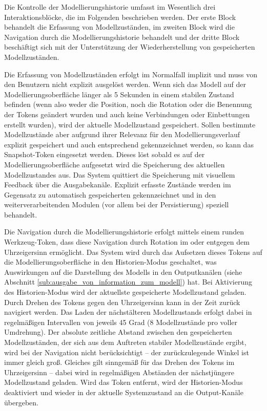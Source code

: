 Die Kontrolle der Modellierungshistorie umfasst im Wesentlich drei Interaktionsblöcke, die im Folgenden beschrieben werden. Der erste Block behandelt die Erfassung von Modellzuständen, im zweiten Block wird die Navigation durch die Modellierungshistorie behandelt und der dritte Block beschäftigt sich mit der Unterstützung der Wiederherstellung von gespeicherten Modellzuständen.

Die Erfassung von Modellzuständen erfolgt im Normalfall implizit und muss von den Benutzern nicht explizit ausgelöst werden. Wenn sich das Modell auf der Modellierungsoberfläche länger als 5 Sekunden in einem stabilen Zustand befinden (wenn also weder die Position, noch die Rotation oder die Benennung der Tokens geändert wurden und auch keine Verbindungen oder Einbettungen erstellt wurden), wird der aktuelle Modellzustand gespeichert. Sollen bestimmte Modellzustände aber aufgrund ihrer Relevanz für den Modellierungsverlauf explizit gespeichert und auch entsprechend gekennzeichnet werden, so kann das Snapshot-Token eingesetzt werden. Dieses löst sobald es auf der Modellierungsoberfläche aufgesetzt wird die Speicherung des aktuellen Modellzustandes aus. Das System quittiert die Speicherung mit visuellem Feedback über die Ausgabekanäle. Explizit erfasste Zustände werden im Gegensatz zu automatisch gespeicherten gekennzeichnet und in den weiterverarbeitenden Modulen (vor allem bei der Persistierung) speziell behandelt.

Die Navigation durch die Modellierungshistorie erfolgt mittels einem runden Werkzeug-Token, dass diese Navigation durch Rotation im oder entgegen dem Uhrzeigersinn ermöglicht. Das System wird durch das Aufsetzen dieses Tokens auf die Modellierungsoberfläche in den Historien-Modus geschaltet, was Auswirkungen auf die Darstellung des Modells in den Outputkanälen (siehe Abschnitt \ref{sub:ausgabe_von_information_zum_modell}) hat. Bei Aktivierung des Historien-Modus wird der aktuellste gespeicherte Modellzustand geladen. Durch Drehen des Tokens gegen den Uhrzeigersinn kann in der Zeit zurück navigiert werden. Das Laden der nächstälteren Modellzustands erfolgt dabei in regelmäßigen Intervallen von jeweils 45 Grad (8 Modellzustände pro voller Umdrehung). Der absolute zeitliche Abstand zwischen den gespeicherten Modellzuständen, der sich aus dem Auftreten stabiler Modellzustände ergibt, wird bei der Navigation nicht berücksichtigt -- der zurückzulegende Winkel ist immer gleich groß. Gleiches gilt sinngemäß für das Drehen des Tokens im Uhrzeigersinn -- dabei wird in regelmäßigen Abständen der nächstjüngere Modellzustand geladen. Wird das Token entfernt, wird der Historien-Modus deaktiviert und wieder in der aktuelle Systemzustand an die Output-Kanäle übergeben.


